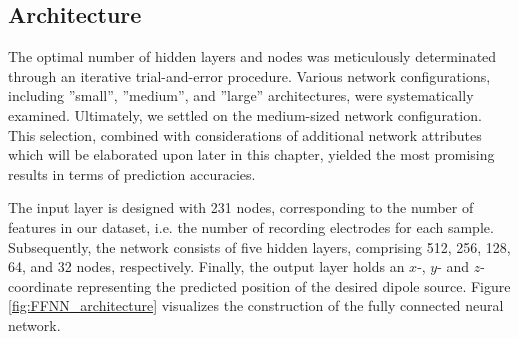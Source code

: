 \documentclass[a4paper, UKenglish, 11pt]{uiomaster}
\begin{document}
\subsection{Architecture}



The optimal number of hidden layers and nodes was meticulously determinated through an iterative trial-and-error procedure. Various network configurations, including ''small'', ''medium'', and ''large'' architectures, were systematically examined. Ultimately, we settled on the medium-sized network configuration. This selection, combined with considerations of additional network attributes which will be elaborated upon later in this chapter, yielded the most promising results in terms of prediction accuracies.

The input layer is designed with 231 nodes, corresponding to the number of features in our dataset, i.e. the number of recording electrodes for each sample. Subsequently, the network consists of five hidden layers, comprising 512, 256, 128, 64, and 32 nodes, respectively. Finally, the output layer holds an $x$-, $y$- and $z$-coordinate representing the predicted position of the desired dipole source. Figure \ref{fig:FFNN_architecture} visualizes the construction of the fully connected neural network.
\end{document}
